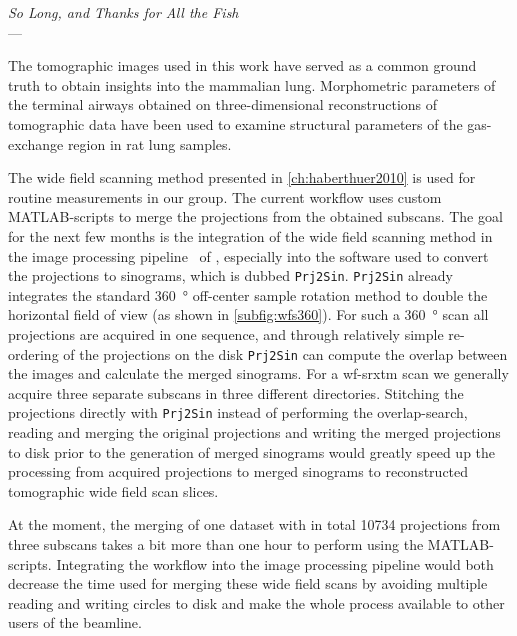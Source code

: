 \acresetall
{}\label{ch:outlook}
\begin{flushright}{\slshape    
		So Long, and Thanks for All the Fish} \\ \medskip
    ---  \citep{Adams1984}
\end{flushright}

\vfill

The tomographic images used in this work have served as a common ground truth to obtain insights into the mammalian lung. Morphometric parameters of the terminal airways obtained on three-dimensional reconstructions of tomographic data have been used to examine structural parameters of the gas-exchange region in rat lung samples.

The wide field scanning method presented in \autoref{ch:haberthuer2010} is used for routine measurements in our group. The current workflow uses custom MATLAB-scripts to merge the projections from the obtained subscans. The goal for the next few months is the integration of the wide field scanning method in the image processing pipeline~\cite{Hintermueller2010} of , especially into the software used to convert the projections to sinograms, which is dubbed \texttt{Prj2Sin}. \texttt{Prj2Sin} already integrates the standard \SI{360}{\degree} off-center sample rotation method to double the horizontal field of view (as shown in \autoref{subfig:wfs360}). For such a \SI{360}{\degree} scan all projections are acquired in one sequence, and through relatively simple re-ordering of the projections on the disk \texttt{Prj2Sin} can compute the overlap between the images and calculate the merged sinograms. For a \ac{wf-srxtm} scan we generally acquire three separate subscans in three different directories. Stitching the projections directly with \texttt{Prj2Sin} instead of performing the overlap-search, reading and merging the original projections and writing the merged projections to disk prior to the generation of merged sinograms would greatly speed up the processing from acquired projections to merged sinograms to reconstructed tomographic wide field scan slices.

At the moment, the merging of one dataset with in total \num{10734} projections from three subscans takes a bit more than one hour to perform using the MATLAB-scripts. Integrating the workflow into the image processing pipeline would both decrease the time used for merging these wide field scans by avoiding multiple reading and writing circles to disk and make the whole process available to other users of the beamline.

